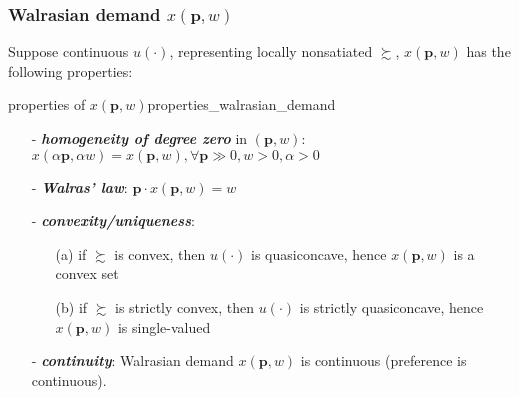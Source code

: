 \subsubsection*{Walrasian demand $ x(\mathbf{p},w)$}
Suppose continuous $u(\cdot)$, representing locally nonsatiated $\succsim$, $ x(\mathbf{p},w)$ has the following properties:
\begin{theorem}{properties of $ x(\mathbf{p},w)$}{properties_walrasian_demand}
    \begin{enumerate}
        \item[-] \textit{\textbf{homogeneity of degree zero}} in $(\mathbf{p},w)$: $ x(\alpha\mathbf{p},\alpha w)= x(\mathbf{p},w),\forall \mathbf{p}\gg 0,w>0,\alpha>0$
        \item[-] \textit{\textbf{Walras' law}}: $\mathbf{p}\cdot  x(\mathbf{p},w)=w$
        \item[-] \textit{\textbf{convexity/uniqueness}}:
        \begin{enumerate}
            \item[(a)] if $\succsim$ is convex, then $u(\cdot)$ is quasiconcave, hence $ x(\mathbf{p},w)$ is a convex set
            \item[(b)] if $\succsim$ is strictly convex, then $u(\cdot)$ is strictly quasiconcave, hence $ x(\mathbf{p},w)$ is single-valued    
        \end{enumerate}
        \item[-] \textit{\textbf{continuity}}: Walrasian demand $ x(\mathbf{p},w)$ is continuous (preference is continuous). 
    \end{enumerate}
\end{theorem}

